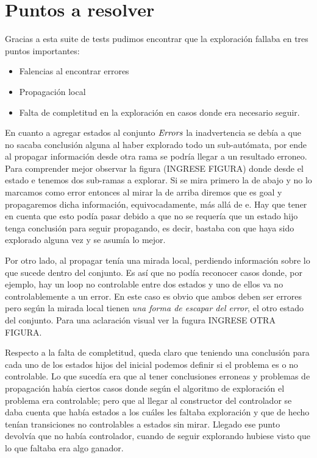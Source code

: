 \section{Puntos a resolver}
Gracias a esta suite de tests pudimos encontrar que la exploración fallaba en tres puntos importantes:
\begin{itemize}
 \item Falencias al encontrar errores
 \item Propagación local
 \item Falta de completitud en la exploración en casos donde era necesario seguir.
\end{itemize}

En cuanto a agregar estados al conjunto $\mathit{Errors}$ la inadvertencia se debía a que no sacaba conclusión alguna al haber explorado todo un sub-autómata, por ende al propagar información desde otra rama se podría llegar a un resultado erroneo. Para comprender mejor observar la figura (INGRESE FIGURA) donde desde el estado e tenemos dos sub-ramas a explorar. Si se mira primero la de abajo y no lo marcamos como error entonces al mirar la de arriba diremos que es goal y propagaremos dicha información, equivocadamente, más allá de e. Hay que tener en cuenta que esto podía pasar debido a que no se requería que un estado hijo tenga conclusión para seguir propagando, es decir, bastaba con que haya sido explorado alguna vez y se asumía lo mejor.

Por otro lado, al propagar tenía una mirada local, perdiendo información sobre lo que sucede dentro del conjunto. Es así que no podía reconocer casos donde, por ejemplo, hay un loop no controlable entre dos estados y uno de ellos va no controlablemente a un error. En este caso es obvio que ambos deben ser errores pero según la mirada local tienen \textit{una forma de escapar del error}, el otro estado del conjunto. Para una aclaración visual ver la fugura INGRESE OTRA FIGURA.

Respecto a la falta de completitud, queda claro que teniendo una conclusión para cada uno de los estados hijos del inicial podemos definir si el problema es o no controlable. Lo que sucedía era que al tener conclusiones erroneas y problemas de propagación había ciertos casos donde según el algoritmo de exploración el problema era controlable; pero que al llegar al constructor del controlador se daba cuenta que había estados a los cuáles les faltaba exploración y que de hecho tenían transiciones no controlables a estados sin mirar. Llegado ese punto devolvía que no había controlador, cuando de seguir explorando hubiese visto que lo que faltaba era algo ganador.

    

